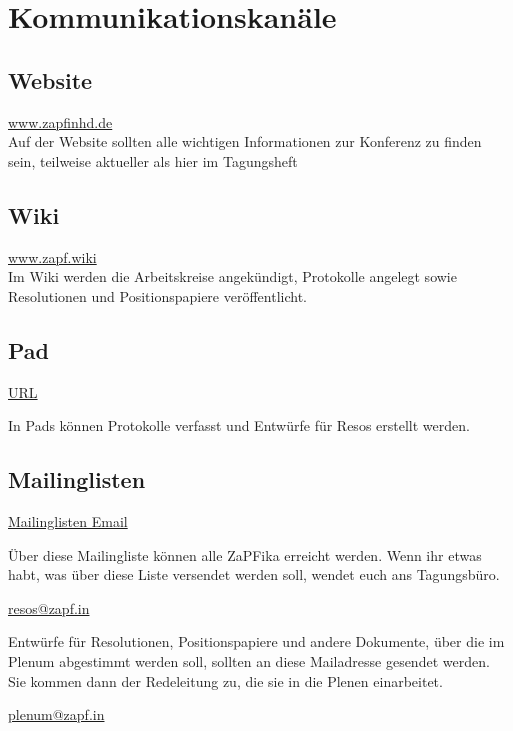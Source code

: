 
\section{Kommunikationskanäle}

\subsection{Website}
\url{www.zapfinhd.de}\\

\noindent Auf der Website sollten alle wichtigen Informationen zur Konferenz zu finden sein, teilweise aktueller als hier im Tagungsheft

\subsection{Wiki}
\url{www.zapf.wiki}\\

\noindent Im Wiki werden die Arbeitskreise angekündigt, Protokolle angelegt sowie Resolutionen und Positionspapiere veröffentlicht.

\subsection{Pad}
\url{URL}\\ 

\noindent In Pads können Protokolle verfasst und Entwürfe für Resos erstellt werden.

\subsection{Mailinglisten}
\url{Mailinglisten Email}\\ 

\noindent Über diese Mailingliste können alle ZaPFika erreicht werden. Wenn ihr etwas habt, was über diese Liste versendet werden soll, wendet euch ans Tagungsbüro.

\url{resos@zapf.in}

Entwürfe für Resolutionen, Positionspapiere und andere Dokumente, über die im Plenum abgestimmt werden soll, sollten an diese Mailadresse gesendet werden. Sie kommen dann der Redeleitung zu, die sie in die Plenen einarbeitet.

\url{plenum@zapf.in}

